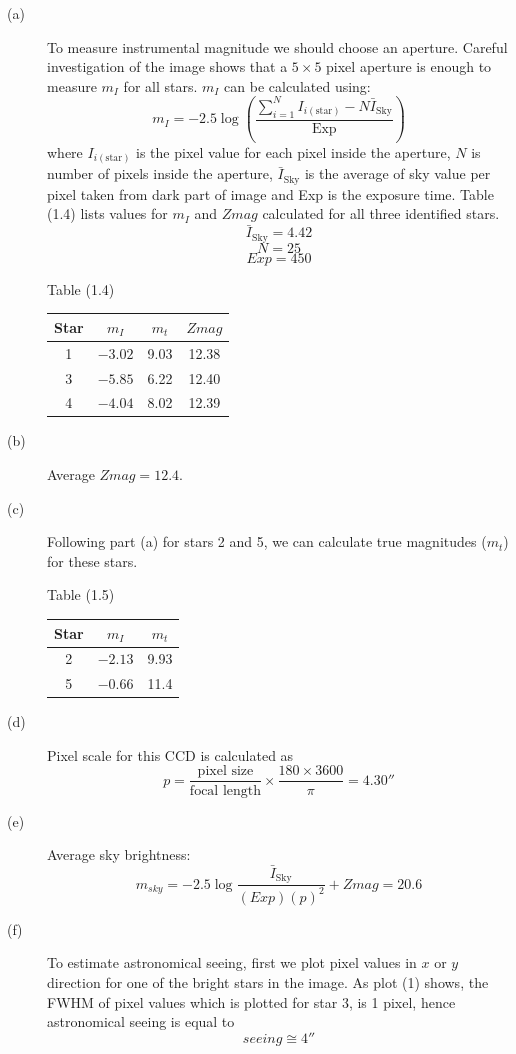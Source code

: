 \begin{description}
\item[(a)] To measure instrumental magnitude we should choose an aperture.
Careful investigation of the image shows that a $5 \times 5$ pixel aperture
is enough to measure $m_I$ for all stars. $m_I$ can be calculated using:
\[ m_I = -2.5\log\!\left(\frac{\sum_{i=1}^{N} I_{i(\mathrm{star})} - N\bar{I}_{\mathrm{Sky}}}{\mathrm{Exp}}\right) \]
where $I_{i(\mathrm{star})}$ is the pixel value for each pixel inside the
aperture, $N$ is number of pixels inside the aperture,
$\bar{I}_{\mathrm{Sky}}$ is the average of sky value per pixel taken from
dark part of image and Exp is the exposure time. Table (1.4) lists values
for $m_I$ and $Zmag$ calculated for all three identified stars.
\[ \bar{I}_{\mathrm{Sky}} = 4.42 \]
\[ N = 25 \]
\[ Exp = 450 \]

\begin{center}
Table (1.4)\\[2pt]
\begin{tabular}{|c|c|c|c|}
\hline
Star & $m_I$ & $m_t$ & $Zmag$ \\
\hline
1 & $-3.02$ & 9.03 & 12.38 \\
\hline
3 & $-5.85$ & 6.22 & 12.40 \\
\hline
4 & $-4.04$ & 8.02 & 12.39 \\
\hline
\end{tabular}
\end{center}

\item[(b)] Average $Zmag = 12.4$.

\item[(c)] Following part (a) for stars 2 and 5, we can calculate true
magnitudes ($m_t$) for these stars.

\begin{center}
Table (1.5)\\[2pt]
\begin{tabular}{|c|c|c|}
\hline
Star & $m_I$ & $m_t$ \\
\hline
2 & $-2.13$ & 9.93 \\
\hline
5 & $-0.66$ & 11.4 \\
\hline
\end{tabular}
\end{center}

\item[(d)] Pixel scale for this CCD is calculated as
\[ p = \frac{\text{pixel size}}{\text{focal length}} \times \frac{180 \times 3600}{\pi} = 4.30'' \]

\item[(e)] Average sky brightness:
\[ m_{sky} = -2.5\log\frac{\bar{I}_{\mathrm{Sky}}}{(Exp)(p)^2} + Zmag = 20.6 \]

\item[(f)] To estimate astronomical seeing, first we plot pixel values in
$x$ or $y$ direction for one of the bright stars in the image. As plot (1)
shows, the FWHM of pixel values which is plotted for star 3, is 1 pixel,
hence astronomical seeing is equal to
\[ seeing \cong 4'' \]

\end{description}

